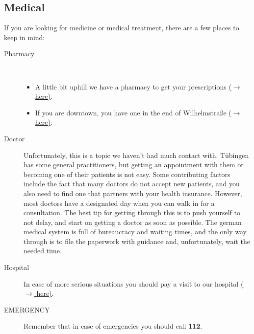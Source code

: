 \subsection{Medical}
If you are looking for medicine or medical treatment, there are a few places to keep in mind:

\begin{description}
    \item[Pharmacy] \ \
        \begin{itemize}
            \item A little bit uphill we have a pharmacy to get your prescriptions \href{https://maps.app.goo.gl/cpDLc9VZ7XukpgS18}{($\xrightarrow{}$ here)}.
            \item If you are downtown, you have one in the end of Wilhelmstraße \href{https://maps.app.goo.gl/YXwvVpp81eTSZeJW7}{($\xrightarrow{}$ here)}.
        \end{itemize}
  
    \item[Doctor]
     Unfortunately, this is a topic we haven’t had much contact with. Tübingen has some general practitioners, but getting an appointment with them or becoming one of their patients is not easy. Some contributing factors include the fact that many doctors do not accept new patients, and you also need to find one that partners with your health insurance. However, most doctors have a designated day when you can walk in for a consultation. The best tip for getting through this is to push yourself to not delay, and start on getting a doctor as soon as possible. The german medical system is full of bureaucracy and waiting times, and the only way through is to file the paperwork with guidance and, unfortunately, wait the needed time.
   
    \item[Hospital]
    In case of more serious situations you should pay a visit to our hospital \href{https://maps.app.goo.gl/EHyduztd2QgxTVer9}{($\xrightarrow{}$ here)}.

    \item[EMERGENCY]
    Remember that in case of emergencies you should call \textbf{112}.
\end{description}

